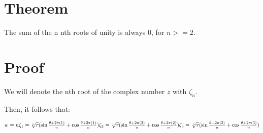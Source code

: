 \documentclass{article}
\begin{document}
\section{Theorem}

The sum of the n nth roots of unity is always 0, for $n >=2  $.

\section{Proof}

We will denote the nth root of the complex number $z$ with $\zeta_n$.

Then, it follows that:

$
w=n \\
\zeta_1 = \sqrt[n]{r}(\sin{\frac{\theta + 2\pi(1)}{n}} + \cos{\frac{\theta + 2\pi(1)}{n}})
\\
\zeta_2 = \sqrt[n]{r}(\sin{\frac{\theta + 2\pi(2)}{n}} + \cos{\frac{\theta + 2\pi(2)}{n}})

\zeta_3 = \sqrt[n]{r}(\sin{\frac{\theta + 2\pi(3)}{n}} + \cos{\frac{\theta + 2\pi(3)}{n}})

$
\end{document}
